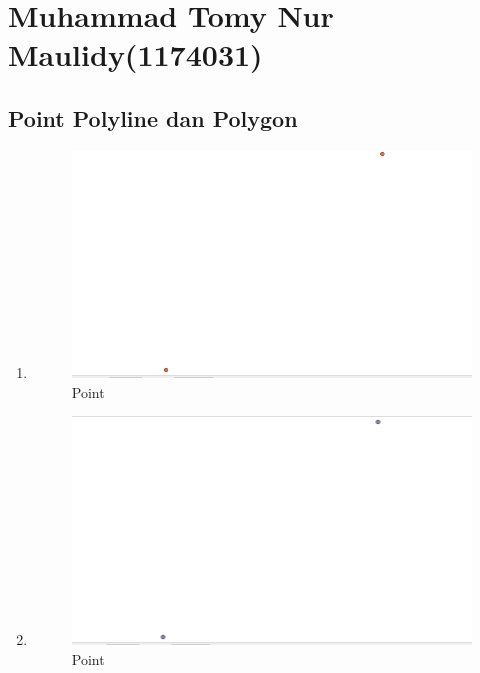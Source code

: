 \section{Muhammad Tomy Nur Maulidy(1174031)}
\subsection{Point Polyline dan Polygon}
\begin{enumerate}
	\item 
	
	\begin{figure}[H]
		\includegraphics[width=12cm]{figures/1174031/2/hasil1.PNG}
		\centering
		\caption{Point}
	\end{figure}
	
	\item 
	
	\begin{figure}[H]
		\includegraphics[width=12cm]{figures/1174031/2/hasil2.PNG}
		\centering
		\caption{Point}
	\end{figure}
	

\end{enumerate}
